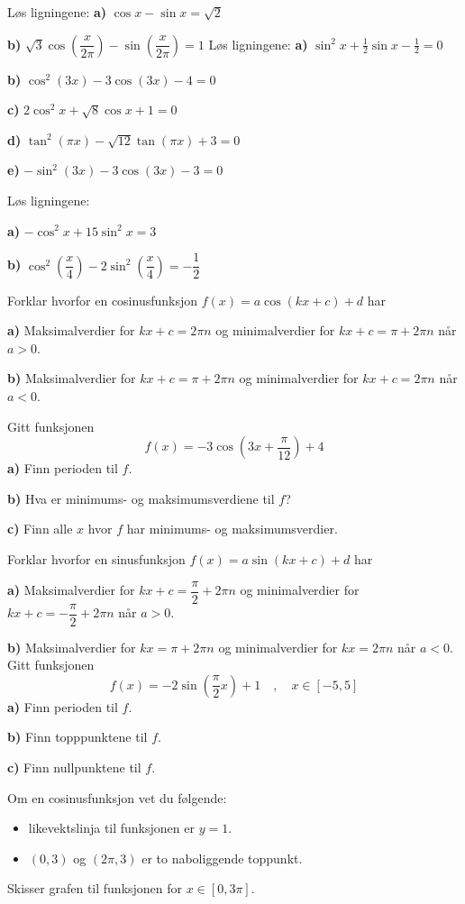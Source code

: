 Løs ligningene:\os
\textbf{a)} $ \cos x - \sin x = \sqrt{2}  $ \os

\textbf{b)} $ \sqrt{3} \cos\left(\dfrac{x}{2\pi}\right) - \sin\left(\dfrac{x}{2\pi}\right)=1 $\os
\nes
\newpage
{}
Løs ligningene:\os
\textbf{a)} $ \sin^2 x+\frac{1}{2}\sin x-\frac{1}{2}=0 $\os

\textbf{b)} $ \cos^2 (3x) -3\cos (3x) -4=0$\os

\textbf{c)} $ 2\cos^2 x+ \sqrt{8} \cos x+1=0 $\os

\textbf{d)} $ \tan^2 (\pi x) -\sqrt{12}\tan (\pi x) +  3=0$\os

\textbf{e)} $ -\sin^2(3x)- 3\cos (3x) -3=0$ \os


Løs ligningene:\os

\textbf{a)} $ -\cos^2 x+15\sin^2 x = 3 $ 

\textbf{b)} $ \cos^2 \left(\dfrac{x}{4}\right) - 2 \sin^2 \left(\dfrac{x}{4}\right) = -\dfrac{1}{2} $

\nes
{}	
Forklar hvorfor en cosinusfunksjon $ f(x)=a\cos(kx+c)+d $ har\os

\textbf{a)} Maksimalverdier for $ kx+c= 2\pi n$ og minimalverdier for $ kx+c= \pi + 2\pi n $ når $ a>0 $.\os

\textbf{b)} Maksimalverdier for $ kx+c= \pi+2\pi n$ og minimalverdier for $ kx+c= 2\pi n $ når $ a<0 $. 

Gitt funksjonen 
\[ f(x)=-3\cos\left(3x+\frac{\pi}{12}\right)+4 \]
\textbf{a)} Finn perioden til $ f $.\os

\textbf{b)} Hva er minimums- og maksimumsverdiene til $ f $?\os

\textbf{c)} Finn alle $ x $ hvor $ f $ har minimums- og maksimumsverdier.


Forklar hvorfor en sinusfunksjon $ f(x)=a\sin(kx+c)+d $ har\os

\textbf{a)} Maksimalverdier for $ kx+c=\dfrac{\pi}{2}+ 2\pi n$ og minimalverdier for $ kx+c= -\dfrac{\pi}{2} + 2\pi n $ når $ a>0 $.\os

\textbf{b)} Maksimalverdier for $ kx= \pi+2\pi n$ og minimalverdier for $ kx= 2\pi n $ når $ a<0 $. 
\newpage
{}
Gitt funksjonen 
\[ f(x)=-2\sin\left(\frac{\pi}{2}x\right)+1 \quad, \quad x\in[-5, 5]\]
\textbf{a)} Finn perioden til $ f $.\os

\textbf{b)} Finn topppunktene til $ f $. \os

\textbf{c)} Finn nullpunktene til $ f $.\os

Om en cosinusfunksjon vet du følgende:
\begin{itemize}
	\item likevektslinja til funksjonen er $ y=1 $.
	\item $ (0,3) $ og $ (2\pi, 3) $ er to naboliggende toppunkt.
\end{itemize}
Skisser grafen til funksjonen for ${ x\in[0, 3\pi]} $.

